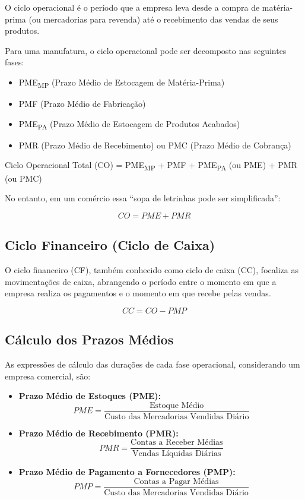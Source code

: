 \documentclass[
  a4paper,
]{book}
\providecommand{\tightlist}{%
  \setlength{\itemsep}{0pt}\setlength{\parskip}{0pt}}\usepackage{longtable,booktabs,array}
\begin{document}
O ciclo operacional é o período que a empresa leva desde a compra de
matéria-prima (ou mercadorias para revenda) até o recebimento das vendas
de seus produtos.

Para uma manufatura, o ciclo operacional pode ser decomposto nas
seguintes fases:

\begin{itemize}
\tightlist
\item
  PME\textsubscript{MP} (Prazo Médio de Estocagem de Matéria-Prima)
\item
  PMF (Prazo Médio de Fabricação)
\item
  PME\textsubscript{PA} (Prazo Médio de Estocagem de Produtos Acabados)
\item
  PMR (Prazo Médio de Recebimento) ou PMC (Prazo Médio de Cobrança)
\end{itemize}

Ciclo Operacional Total (CO) = PME\textsubscript{MP} + PMF +
PME\textsubscript{PA} (ou PME) + PMR (ou PMC)

No entanto, em um comércio essa ``sopa de letrinhas pode ser
simplificada'':

\[CO = PME + PMR\]

\subsection{Ciclo Financeiro (Ciclo de
Caixa)}\label{ciclo-financeiro-ciclo-de-caixa}

O ciclo financeiro (CF), também conhecido como ciclo de caixa (CC),
focaliza as movimentações de caixa, abrangendo o período entre o momento
em que a empresa realiza os pagamentos e o momento em que recebe pelas
vendas.

\[CC = CO - PMP\]

\subsection{Cálculo dos Prazos
Médios}\label{cuxe1lculo-dos-prazos-muxe9dios}

As expressões de cálculo das durações de cada fase operacional,
considerando um empresa comercial, são:

\begin{itemize}
\tightlist
\item
  \textbf{Prazo Médio de Estoques (PME):}
  \[PME = \frac{\text{Estoque Médio}}{\text{Custo das Mercadorias Vendidas Diário}}\]
\item
  \textbf{Prazo Médio de Recebimento (PMR):}
  \[PMR = \frac{\text{Contas a Receber Médias}}{\text{Vendas Líquidas Diárias}}\]
\item
  \textbf{Prazo Médio de Pagamento a Fornecedores (PMP):}
  \[PMP = \frac{\text{Contas a Pagar Médias}}{\text{Custo das Mercadorias Vendidas Diário}}\]
\end{itemize}
\end{document}
